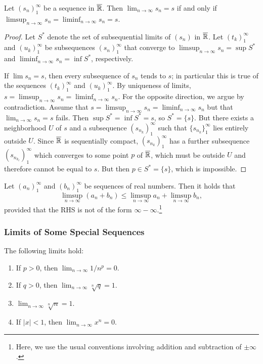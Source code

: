 \documentclass[12pt]{article} %
\begin{document}
\begin{theorem}
    Let $(s_n)_1^\infty$ be a sequence in $\overline{\mathbb{R}}$. Then $\lim_{n \to \infty} s_n = s$ if and only if $\limsup_{n \to \infty} s_n = \liminf_{n \to \infty} s_n = s$.
\end{theorem}

\begin{proof}
    Let $S^*$ denote the set of subsequential limits of $(s_n)$ in $\overline{\mathbb{R}}$. Let $(t_k)_1^\infty$ and $(u_k)_1^\infty$ be subsequences $(s_n)_1^\infty$ that converge to $\limsup_{n \to \infty} s_n = \sup S^*$ and $\liminf_{n \to \infty} s_n = \inf S^*$, respectively. 

    If $\lim s_n = s$, then every subsequence of $s_n$ tends to $s$; in particular this is true of the sequences $(t_k)_1^\infty$ and $(u_k)_1^\infty$. By uniqueness of limits, $s = \limsup_{n \to \infty} s_n = \liminf_{n \to \infty} s_n$. For the opposite direction, we argue by contradiction. Assume that $s = \limsup_{n \to \infty} s_n = \liminf_{n \to \infty} s_n$ but that $\lim_{n \to \infty} s_n = s$ fails. Then $\sup S^* = \inf S^* = s$, so $S^* = \{s\}$. But there exists a neighborhood $U$ of $s$ and a subsequence $(s_{n_k})_1^\infty$ such that $\{s_{n_k}\}_1^\infty$ lies entirely outside $U$. Since $\overline{\mathbb{R}}$ is sequentially compact, $(s_{n_k})_1^\infty$ has a further subsequence $(s_{n_{k_\ell}})_1^\infty$ which converges to some point $p$ of $\overline{\mathbb{R}}$, which must be outside $U$ and therefore cannot be equal to $s$. But then $p \in S^* = \{s\}$, which is impossible.
\end{proof}

\begin{proposition}
    Let $(a_n)_1^\infty$ and $(b_n)_1^\infty$ be sequences of real numbers. Then it holds that \[\limsup_{n \to \infty} (a_n + b_n) \leq \limsup_{n \to \infty} a_n + \limsup_{n \to \infty} b_n,\] provided that the RHS is not of the form $\infty - \infty$.\footnote{Here, we use the usual conventions involving addition and subtraction of $\pm \infty$.}
\end{proposition}

\subsubsection{Limits of Some Special Sequences}

\begin{theorem}
    The following limits hold:\begin{enumerate}
        \item If $p > 0$, then $\lim_{n \to \infty} 1/n^p = 0$.
        \item If $q > 0$, then $\lim_{n \to \infty} \sqrt[n]{q} = 1$.
        \item $\lim_{n \to \infty} \sqrt[n]{n} = 1$.
        \item If $|x| < 1$, then $\lim_{n \to \infty} x^n = 0$.
    \end{enumerate}
\end{theorem}
\end{document}
